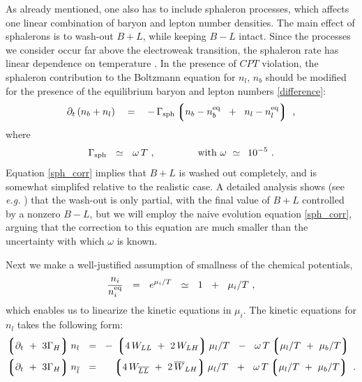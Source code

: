\documentclass[12pt]{revtex4}
\newcommand{\eq}{{\rm eq}}
\newcommand{\lgr}{\left\lgroup}
\newcommand{\rgr}{\right\rgroup}
\newcommand{\Gsph}{\Gamma_{\rm sph}}
\newcommand{\p}{\partial}
\newcommand{\ov}{\overline}
\begin{document}
	As already mentioned,
	one also has to include sphaleron processes, which affects 
	one linear combination of baryon and lepton number densities.
	The main effect of sphalerons is to wash-out $ B + L $,
	while keeping $ B - L $ intact. 
	Since the processes we consider occur far above the electroweak transition,  the sphaleron rate
has linear
	dependence on temperature 
\cite{Kuzmin:1985mm,Khlebnikov:1988sr}. 
	In the presence of $CPT$ violation, the sphaleron contribution to the Boltzmann equation
	for $ n_l $, $ n_b $ 
\cite{Kuzmin:1985mm,Moore:2000mx,Moore:2000ar} should be modified for the presence of the 
equilibrium baryon and lepton numbers \eqref{difference}:
\begin{equation}
\label{sph_corr}
	\p_t\, (n_b + n_l)
	~~~=~~~ -\, \Gsph 
		\lgr   n_b - n_b^\eq \;~+~\;
		       n_l - n_l^\eq 
		\rgr~,
\end{equation}
	where
\[
	\Gsph ~~\simeq~~ \omega\, T~, \qquad\qquad 
	{\rm ~with~}
	\omega ~\simeq~ \,10^{-5}~.
\]
	Equation \eqref{sph_corr} implies that $ B + L $ is washed out completely,
	and is somewhat simplifed relative to the realistic case.
	A detailed analysis shows (see {\em e.g.}
\cite{Harvey:1990qw})
	that the wash-out is only partial, with the final value of $B+L$ controlled by a nonzero $B-L$,
but we will employ the naive evolution equation
	\eqref{sph_corr}, arguing that the correction to this equation are much smaller
	than the uncertainty with which $ \omega $ is known.
	
	Next we make a well-justified assumption of 
	smallness of the chemical potentials,
\[
	\frac{n_i}{n_i^\eq} ~~=~~ e^{\mu_i/T} ~~\simeq~~ 1 ~~+~~ \mu_i/T~,
\]
	which enables us to linearize the kinetic equations in $ \mu_i $.	
The kinetic equations for $ n_l$ takes the following form:
\begin{equation}
\label{kinetic_eqn_prelim}
\begin{split}
	\lgr \p_t ~+~ 3\Gamma_H \rgr
		n_l ~~=~~ & 
	-\, \lgr 4\, W_{LL} ~+~ 2\, W_{L{H}} \rgr  \mu_l/T 
	~~-~~
	\omega\, T \lgr \mu_l/T ~+~ \mu_b/T \rgr 
	\\
	\lgr \p_t ~+~ 3\Gamma_H \rgr
		n_{\ov{l}} ~~=~~ &
	\phantom{-\,}
	\lgr 4\, W_{\ov{LL}} ~+~ 2\, \ov{W}_{L{H}} \rgr  \mu_l/T 
	~~+~~
	\omega\, T \lgr \mu_l/T ~+~ \mu_b/T \rgr ~.
\end{split}
\end{equation}
\end{document}
